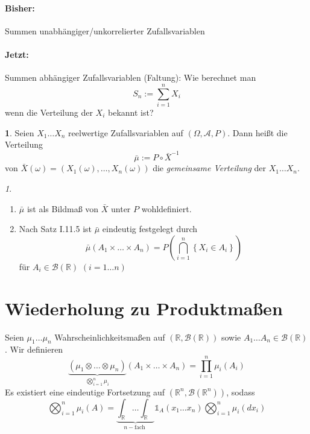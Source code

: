\documentclass[10pt,a4paper]{report}
\numberwithin{equation}{section}
\numberwithin{figure}{section}
\theoremstyle{plain}
\theoremstyle{definition}
\newtheorem{defn}[thm]{\protect\definitionname}
\theoremstyle{remark}
\newtheorem{rem}[thm]{\protect\remarkname}
\theoremstyle{plain}
\providecommand{\definitionname}{Definition}
\providecommand{\remarkname}{Bemerkung}
\newcommand{\1}{ \mathbb{1} } %
\begin{document}
\paragraph*{Bisher: }

Summen unabhängiger/unkorrelierter Zufallsvariablen


\paragraph*{Jetzt:}

Summen abhängiger Zufallsvariablen (Faltung): Wie berechnet man 
\[
S_{n}:=\sum_{i=1}^{n}X_{i}
\]
wenn die Verteilung der $X_{i}$ bekannt ist?
\begin{defn}   %
  Seien $X_{1}\ldots X_{n}$ reelwertige Zufallsvariablen auf $\left(\Omega,\mathcal{A},P\right)$.
  Dann heißt die Verteilung 
  \[
  \bar{\mu}:=P\circ\bar{X}^{-1}
  \]
  von $\bar{X}\left(\omega\right)=\left(X_{1}\left(\omega\right),\ldots,X_{n}\left(\omega\right)\right)$
  die \emph{gemeinsame Verteilung} der
  $X_{1}\ldots X_{n}$.
\end{defn}
\begin{rem}
  \ 
  \begin{enumerate}
  \item $\bar{\mu}$ ist als Bildmaß von $\bar{X}$ unter $P$ wohldefiniert.
  \item Nach Satz I.11.5 ist $\bar{\mu}$ eindeutig festgelegt durch
    \[
    \bar{\mu}\left(A_{1}\times\ldots\times A_{n}\right)=P\left(\bigcap_{i=1}^{n}\left\{ X_{i}\in A_{i}\right\} \right)
    \]
    für $A_{i}\in\mathcal{B}\left(\mathbb{R}\right)$ $\left(i=1\ldots n\right)$ 
  \end{enumerate}
\end{rem}

\section*{Wiederholung zu Produktmaßen}

Seien $\mu_{1}\ldots\mu_{n}$ Wahrscheinlichkeitsmaßen auf $\left(\mathbb{R},\mathcal{B}\left(\mathbb{R}\right)\right)$
sowie $A_{1}\ldots A_{n}\in\mathcal{B}\left(\mathbb{R}\right)$. Wir
definieren 
\[
\underset{\bigotimes_{i=1}^{n}\mu_{i}}{\underbrace{\left(\mu_{1}\otimes\ldots\otimes\mu_{n}\right)}}\left(A_{1}\times\ldots\times A_{n}\right)=\prod_{i=1}^{n}\mu_{i}\left(A_{i}\right)
\]
Es existiert eine eindeutige Fortsetzung auf $\left(\mathbb{R}^{n},\mathcal{B}\left(\mathbb{R}^{n}\right)\right)$,
sodass 
\[
\bigotimes_{i=1}^{n}\mu_{i}\left(A\right)=\underset{n-\text{fach }}{\underbrace{\int_{\mathbb{R}}\ldots\int_{\mathbb{R}}}}\1_{A}\left(x_{1}\ldots x_{n}\right)\bigotimes_{i=1}^{n}\mu_{i}\left(dx_{i}\right)
\]
\end{document}
